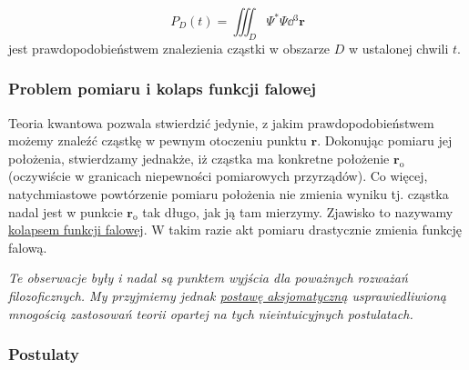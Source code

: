 \documentclass{myclass}
\begin{document}
\begin{equation*}
    P_D(t)=\iiint_D\Psi^*\Psi\dd{^3\mathbf{r}}
\end{equation*}
jest prawdopodobieństwem znalezienia cząstki w obszarze \(D\) w ustalonej chwili \(t\).

\subsubsection{Problem pomiaru i kolaps funkcji falowej}

Teoria kwantowa pozwala stwierdzić jedynie, z jakim prawdopodobieństwem możemy znaleźć cząstkę w
pewnym otoczeniu punktu \(\mathbf{r}\). Dokonując pomiaru jej położenia, stwierdzamy jednakże, iż
cząstka ma konkretne położenie \(\mathbf{r}_\text{o}\) (oczywiście w granicach niepewności
pomiarowych przyrządów). Co więcej, natychmiastowe powtórzenie pomiaru położenia nie zmienia wyniku
tj. cząstka nadal jest w punkcie \(\mathbf{r}_\text{o}\) tak długo, jak ją tam mierzymy. Zjawisko to
nazywamy \underline{kolapsem funkcji falowej}. W takim razie akt pomiaru drastycznie zmienia funkcję
falową.
\medskip

\textit{Te obserwacje były i nadal są punktem wyjścia dla poważnych rozważań filozoficznych. My
przyjmiemy jednak \underline{postawę aksjomatyczną} usprawiedliwioną mnogością zastosowań teorii
opartej na tych nieintuicyjnych postulatach.}

\subsubsection{Postulaty}
\end{document}
